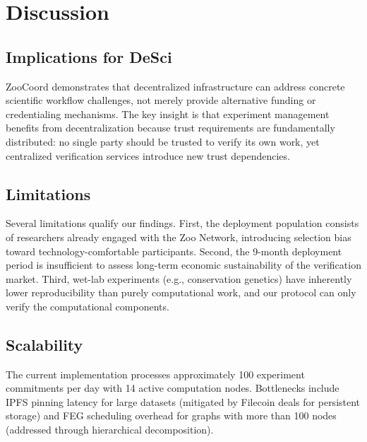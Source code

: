 \section{Discussion}

\label{sec:discussion}

\subsection{Implications for DeSci}

ZooCoord demonstrates that decentralized infrastructure can address concrete scientific workflow challenges, not merely provide alternative funding or credentialing mechanisms.
The key insight is that experiment management benefits from decentralization because trust requirements are fundamentally distributed: no single party should be trusted to verify its own work, yet centralized verification services introduce new trust dependencies.

\subsection{Limitations}

Several limitations qualify our findings.
First, the deployment population consists of researchers already engaged with the Zoo Network, introducing selection bias toward technology-comfortable participants.
Second, the 9-month deployment period is insufficient to assess long-term economic sustainability of the verification market.
Third, wet-lab experiments (e.g., conservation genetics) have inherently lower reproducibility than purely computational work, and our protocol can only verify the computational components.

\subsection{Scalability}

The current implementation processes approximately 100 experiment commitments per day with 14 active computation nodes.
Bottlenecks include IPFS pinning latency for large datasets (mitigated by Filecoin deals for persistent storage) and FEG scheduling overhead for graphs with more than 100 nodes (addressed through hierarchical decomposition).

